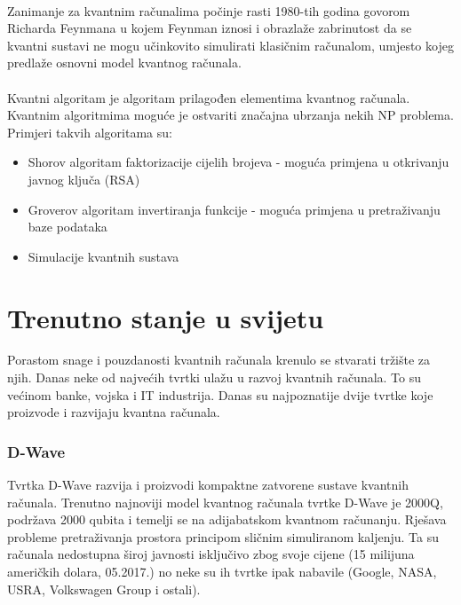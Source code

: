 \documentclass[times, utf8, zavrsni, numeric]{fer}
\begin{document}
\paragraph{}
Zanimanje za kvantnim računalima počinje rasti 1980-tih godina govorom Richarda Feynmana u kojem Feynman iznosi i obrazlaže zabrinutost da se kvantni sustavi ne mogu učinkovito simulirati klasičnim računalom, umjesto kojeg predlaže osnovni model kvantnog računala. \citep{q_history}\citep{feynman}

\paragraph{}
Kvantni algoritam je algoritam prilagođen elementima kvantnog računala. Kvantnim algoritmima moguće je ostvariti značajna ubrzanja nekih NP problema.\cite{qga_apply}\citep{han_phd} Primjeri takvih algoritama su:
\begin{itemize}
\item Shorov algoritam faktorizacije cijelih brojeva - moguća primjena u otkrivanju javnog ključa (RSA)
\item Groverov algoritam invertiranja funkcije - moguća primjena u pretraživanju baze podataka
\item Simulacije kvantnih sustava
\end{itemize}

\clearpage

\section{Trenutno stanje u svijetu}
Porastom snage i pouzdanosti kvantnih računala krenulo se stvarati tržište za njih. Danas neke od najvećih tvrtki ulažu u razvoj kvantnih računala. To su većinom banke, vojska i IT industrija.
Danas su najpoznatije dvije tvrtke koje proizvode i razvijaju kvantna računala.

\subsubsection{D-Wave}
Tvrtka D-Wave razvija i proizvodi kompaktne zatvorene sustave kvantnih računala. Trenutno najnoviji model kvantnog računala tvrtke D-Wave je 2000Q, podržava 2000 qubita i temelji se na adijabatskom kvantnom računanju. Rješava probleme pretraživanja prostora principom sličnim simuliranom kaljenju. Ta su računala nedostupna široj javnosti isključivo zbog svoje cijene (15 milijuna američkih dolara, 05.2017.) no neke su ih tvrtke ipak nabavile (Google, NASA, USRA, Volkswagen Group i ostali).
\end{document}
